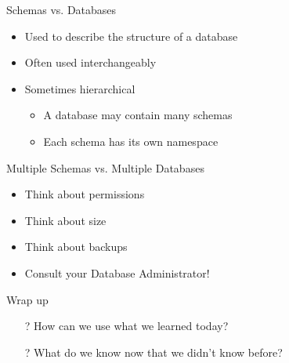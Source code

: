 \documentclass[aspectratio=169]{beamer}
\begin{document}
\begin{frame}{Schemas vs. Databases}

\begin{itemize}
\item Used to describe the structure of a database
\item Often used interchangeably
\item Sometimes hierarchical
\begin{itemize}
\item A database may contain many schemas
\item Each schema has its own namespace
\end{itemize}
\end{itemize}
\end{frame}

\begin{frame}{Multiple Schemas vs. Multiple Databases}

\begin{itemize}
\item Think about permissions
\item Think about size
\item Think about backups
\item Consult your Database Administrator!
\end{itemize}
\end{frame}




\begin{frame}{Wrap up}
\begin{itemize}
	\item[?] How can we use what we learned today?
	\vspace{2em}
	\item[?] What do we know now that we didn't know before?
\end{itemize}


\end{frame}
\end{document}
